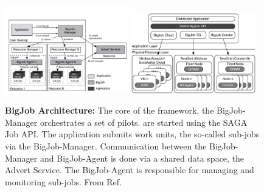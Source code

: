 \documentclass[]{svjour3}
\begin{document}
\begin{figure}[t]
 \centering
  \includegraphics[width=0.48\textwidth]{figures/re_bigjob_interactions.pdf}
 \includegraphics[width=0.48\textwidth]{figures/distributed_pilot_job.pdf}

    \caption{\textbf{BigJob Architecture:} The core of the
     framework, the BigJob-Manager orchestrates a set of
     pilots. \pilots are started using the SAGA Job API. The
     application submits work units, the so-called sub-jobs via the
     BigJob-Manager. Communication between the BigJob-Manager and
     BigJob-Agent is done via a shared data space, the Advert
     Service. The BigJob-Agent is responsible for managing and
     monitoring sub-jobs. From
     Ref.~\cite{saga_bigjob_condor_cloud}}
    \label{fig:figures_re_bigjob_interactions}
\end{figure}
\end{document}
